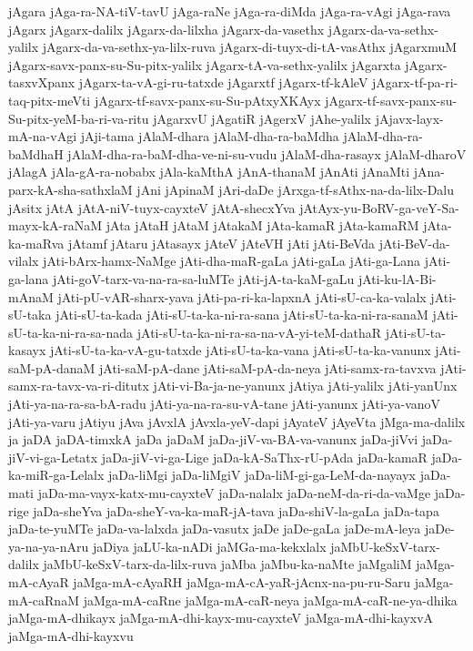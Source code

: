 {jAgara
jAga-ra-NA-tiV-tavU
jAga-raNe
jAga-ra-diMda
jAga-ra-vAgi
jAga-rava
jAgarx
jAgarx-dalilx
jAgarx-da-lilxha
jAgarx-da-vasethx
jAgarx-da-va-sethx-yalilx
jAgarx-da-va-sethx-ya-lilx-ruva
jAgarx-di-tuyx-di-tA-vasAthx
jAgarxmuM
jAgarx-savx-panx-su-Su-pitx-yalilx
jAgarx-tA-va-sethx-yalilx
jAgarxta
jAgarx-tasxvXpanx
jAgarx-ta-vA-gi-ru-tatxde
jAgarxtf
jAgarx-tf-kAleV
jAgarx-tf-pa-ri-taq-pitx-meVti
jAgarx-tf-savx-panx-su-Su-pAtxyXKAyx
jAgarx-tf-savx-panx-su-Su-pitx-yeM-ba-ri-va-ritu
jAgarxvU
jAgatiR
jAgerxV
jAhe-yalilx
jAjavx-layx-mA-na-vAgi
jAji-tama
jAlaM-dhara
jAlaM-dha-ra-baMdha
jAlaM-dha-ra-baMdhaH
jAlaM-dha-ra-baM-dha-ve-ni-su-vudu
jAlaM-dha-rasayx
jAlaM-dharoV
jAlagA
jAla-gA-ra-nobabx
jAla-kaMthA
jAnA-thanaM
jAnAti
jAnaMti
jAna-parx-kA-sha-sathxlaM
jAni
jApinaM
jAri-daDe
jArxga-tf-sAthx-na-da-lilx-Dalu
jAsitx
jAtA
jAtA-niV-tuyx-cayxteV
jAtA-shecxYva
jAtAyx-yu-BoRV-ga-veY-Sa-mayx-kA-raNaM
jAta
jAtaH
jAtaM
jAtakaM
jAta-kamaR
jAta-kamaRM
jAta-ka-maRva
jAtamf
jAtaru
jAtasayx
jAteV
jAteVH
jAti
jAti-BeVda
jAti-BeV-da-vilalx
jAti-bArx-hamx-NaMge
jAti-dha-maR-gaLa
jAti-gaLa
jAti-ga-Lana
jAti-ga-lana
jAti-goV-tarx-va-na-ra-sa-luMTe
jAti-jA-ta-kaM-gaLu
jAti-ku-lA-Bi-mAnaM
jAti-pU-vAR-sharx-yava
jAti-pa-ri-ka-lapxnA
jAti-sU-ca-ka-valalx
jAti-sU-taka
jAti-sU-ta-kada
jAti-sU-ta-ka-ni-ra-sana
jAti-sU-ta-ka-ni-ra-sanaM
jAti-sU-ta-ka-ni-ra-sa-nada
jAti-sU-ta-ka-ni-ra-sa-na-vA-yi-teM-dathaR
jAti-sU-ta-kasayx
jAti-sU-ta-ka-vA-gu-tatxde
jAti-sU-ta-ka-vana
jAti-sU-ta-ka-vanunx
jAti-saM-pA-danaM
jAti-saM-pA-dane
jAti-saM-pA-da-neya
jAti-samx-ra-tavxva
jAti-samx-ra-tavx-va-ri-ditutx
jAti-vi-Ba-ja-ne-yanunx
jAtiya
jAti-yalilx
jAti-yanUnx
jAti-ya-na-ra-sa-bA-radu
jAti-ya-na-ra-su-vA-tane
jAti-yanunx
jAti-ya-vanoV
jAti-ya-varu
jAtiyu
jAva
jAvxlA
jAvxla-yeV-dapi
jAyateV
jAyeVta
jMga-ma-dalilx
ja
jaDA
jaDA-timxkA
jaDa
jaDaM
jaDa-jiV-va-BA-va-vanunx
jaDa-jiVvi
jaDa-jiV-vi-ga-Letatx
jaDa-jiV-vi-ga-Lige
jaDa-kA-SaThx-rU-pAda
jaDa-kamaR
jaDa-ka-miR-ga-Lelalx
jaDa-liMgi
jaDa-liMgiV
jaDa-liM-gi-ga-LeM-da-nayayx
jaDa-mati
jaDa-ma-vayx-katx-mu-cayxteV
jaDa-nalalx
jaDa-neM-da-ri-da-vaMge
jaDa-rige
jaDa-sheYva
jaDa-sheY-va-ka-maR-jA-tava
jaDa-shiV-la-gaLa
jaDa-tapa
jaDa-te-yuMTe
jaDa-va-lalxda
jaDa-vasutx
jaDe
jaDe-gaLa
jaDe-mA-leya
jaDe-ya-na-ya-nAru
jaDiya
jaLU-ka-nADi
jaMGa-ma-kekxlalx
jaMbU-keSxV-tarx-dalilx
jaMbU-keSxV-tarx-da-lilx-ruva
jaMba
jaMbu-ka-naMte
jaMgaliM
jaMga-mA-cAyaR
jaMga-mA-cAyaRH
jaMga-mA-cA-yaR-jAcnx-na-pu-ru-Saru
jaMga-mA-caRnaM
jaMga-mA-caRne
jaMga-mA-caR-neya
jaMga-mA-caR-ne-ya-dhika
jaMga-mA-dhikayx
jaMga-mA-dhi-kayx-mu-cayxteV
jaMga-mA-dhi-kayxvA
jaMga-mA-dhi-kayxvu
}
